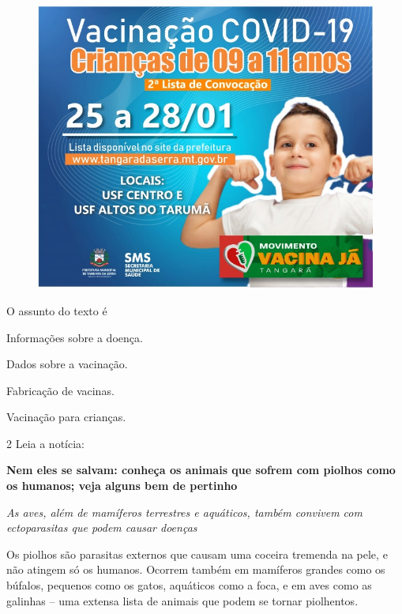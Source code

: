 \begin{figure}[H]
\centering
\includegraphics[width=.85\textwidth]{media/image124.jpeg}
\end{figure}


O assunto do texto é

\begin{escolha}
\item Informações sobre a doença.

\item Dados sobre a vacinação.

\item Fabricação de vacinas.

\item Vacinação para crianças.
\end{escolha}

\num{2} Leia a notícia:

\begin{myquote}
\textbf{Nem eles se salvam: conheça os animais que sofrem com piolhos
como os humanos; veja alguns bem de pertinho}

\textit{As aves, além de mamíferos terrestres e aquáticos, também convivem com
ectoparasitas que podem causar doenças}

Os piolhos são parasitas externos que causam uma coceira tremenda na
pele, e não atingem só os humanos. Ocorrem também em mamíferos grandes
como os búfalos, pequenos como os gatos, aquáticos como a foca, e em
aves como as galinhas -- uma extensa lista de animais que podem se
tornar piolhentos.

\end{myquote}


